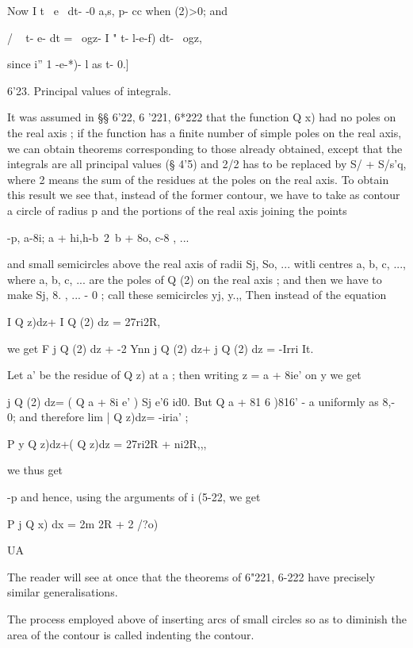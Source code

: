 Now I t~  e~ dt- -0 a,s, p- cc when (2)>0; and 

/ ~ t-  e- dt = \ ogz- I " t-  l-e-f) dt- \ ogz, 

since i''   1 -e-*)- l as t- 0.] 

6'23. Principal values of integrals. 

It was assumed in §§ 6'22, 6 '221, 6*222 that the function Q  x) had no poles on the real 
axis ; if the function has a finite number of simple poles on the real axis, we can obtain 
theorems corresponding to those already obtained, except that the integrals are all principal 
values (§ 4'5) and 2/2 has to be replaced by S/  +  S/s'q, where 2  means the sum of 
the residues at the poles on the real axis. To obtain this result we see that, instead of 
the former contour, we have to take as contour a circle of radius p and the portions of the 
real axis joining the points 

-p, a-8i; a + hi,h-b~2\ b + 8o, c-8 , ... 

and small semicircles above the real axis of radii Sj, So, ... witli centres a, b, c, ..., where 
a, b, c, ... are the poles of Q (2) on the real axis ; and then we have to make Sj, 8. , ... - 0 ; 
call these semicircles yj, y.,, Then instead of the equation 

I Q z)dz+ I Q (2) dz = 27ri2R, 

we get F j Q (2) dz + -2 Ynn j Q (2) dz+ j Q (2) dz = -Irri  It. 

Let a' be the residue of Q z) at a ; then writing z = a + 8ie'  on y  we get 

j Q (2) dz= (  Q a + 8i e' ) Sj e'6 id0. 
But Q  a + 81 6 )816' - a uniformly as 8,- 0; and therefore lim | Q z)dz= -iria' ; 

P y Q z)dz+( Q z)dz = 27ri2R + ni2R,,, 



we thus get 



-p 
and hence, using the arguments of i  (5-22, we get 



P j Q x) dx = 2m  2R +  2 /?o) 



UA 



The reader will see at once that the theorems of   6"221, 6-222 have precisely similar 
generalisations. 

The process employed above of inserting arcs of small circles so as to diminish the area 
of the contour is called indenting the contour. 


